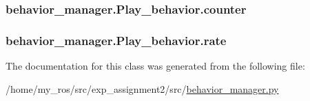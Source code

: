 \subsubsection[{\texorpdfstring{counter}{counter}}]{\setlength{\rightskip}{0pt plus 5cm}behavior\+\_\+manager.\+Play\+\_\+behavior.\+counter}\hypertarget{classbehavior__manager_1_1Play__behavior_a9ef35e23e54823711001f1d3ca3a3c76}{}\label{classbehavior__manager_1_1Play__behavior_a9ef35e23e54823711001f1d3ca3a3c76}
\subsubsection[{\texorpdfstring{rate}{rate}}]{\setlength{\rightskip}{0pt plus 5cm}behavior\+\_\+manager.\+Play\+\_\+behavior.\+rate}\hypertarget{classbehavior__manager_1_1Play__behavior_af636412228a2da30ad114266cbd121e3}{}\label{classbehavior__manager_1_1Play__behavior_af636412228a2da30ad114266cbd121e3}


The documentation for this class was generated from the following file\+:\begin{DoxyCompactItemize}
\item 
/home/my\+\_\+ros/src/exp\+\_\+assignment2/src/\hyperlink{behavior__manager_8py}{behavior\+\_\+manager.\+py}\end{DoxyCompactItemize}
